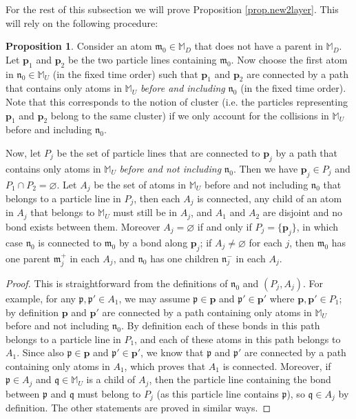 \documentclass[10pt, reqno]{amsart}
\newcommand{\pb}{{\boldsymbol{p}}}
\newcommand{\Mb}{\mathbb M}
\newcommand{\mf}{\mathfrak m}
\newcommand{\pf}{\mathfrak p}
\newcommand{\qf}{\mathfrak q}
\newcommand{\nf}{\mathfrak n}
\theoremstyle{definition}
\newtheorem{proposition}[theorem]{Proposition}
\theoremstyle{remark}
\numberwithin{equation}{section}
\begin{document}
For the rest of this subsection we will prove Proposition \ref{prop.new2layer}. This will rely on the following procedure:
\begin{proposition}\label{prop.2cluster} Consider an atom $\mf_0\in\Mb_D$ that does not have a parent in $\Mb_D$. Let $\pb_1$ and $\pb_2$ be the two particle lines containing $\mf_0$. Now choose the first atom in $\nf_0\in\Mb_U$ (in the fixed time order) such that $\pb_1$ and $\pb_2$ are connected by a path that contains only atoms in $\Mb_U$ \emph{before and including} $\nf_0$ (in the fixed time order). Note that this corresponds to the notion of cluster (i.e. the particles representing $\pb_1$ and $\pb_2$ belong to the same cluster) if we only account for the collisions in $\Mb_U$ before and including $\nf_0$.

Now, let $P_j$ be the set of particle lines that are connected to $\pb_j$ by a path that contains only atoms in $\Mb_U$ \emph{before and not including} $\nf_0$. Then we have $\pb_j\in P_j$ and $P_1\cap P_2=\varnothing$. Let $A_j$ be the set of atoms in $\Mb_U$ before and not including $\nf_0$ that belongs to a particle line in $P_j$, then each $A_j$ is connected, any child of an atom in $A_j$ that belongs to $\Mb_U$ must still be in $A_j$, and $A_1$ and $A_2$ are disjoint and no bond exists between them. Moreover $A_j=\varnothing$ if and only if $P_j=\{\pb_j\}$, in which case $\nf_0$ is connected to $\mf_0$ by a bond along $\pb_j$; if $A_j\neq\varnothing$ for each $j$, then $\mf_0$ has one parent $\mf_j^+$ in each $A_j$, and $\nf_0$ has one children $\nf_j^-$ in each $A_j$.
\end{proposition}
\begin{proof} This is straightforward from the definitions of $\nf_0$ and $(P_j,A_j)$. For example, for any $\pf,\pf'\in A_1$, we may assume $\pf\in \pb$ and $\pf'\in\pb'$ where $\pb,\pb'\in P_1$; by definition $\pb$ and $\pb'$ are connected by a path containing only atoms in $\Mb_U$ before and not including $\nf_0$. By definition each of these bonds in this path belongs to a particle line in $P_1$, and each of these atoms in this path belongs to $A_1$. Since also $\pf\in \pb$ and $\pf'\in\pb'$, we know that $\pf$ and $\pf'$ are connected by a path containing only atoms in $A_1$, which proves that $A_1$ is connected. Moreover, if $\pf\in A_j$ and $\qf\in \Mb_U$ is a child of $A_j$, then the particle line containing the bond between $\pf$ and $\qf$ must belong to $P_j$ (as this particle line contains $\pf$), so $\qf\in A_j$ by definition. The other statements are proved in similar ways.
\end{proof}
\end{document}
